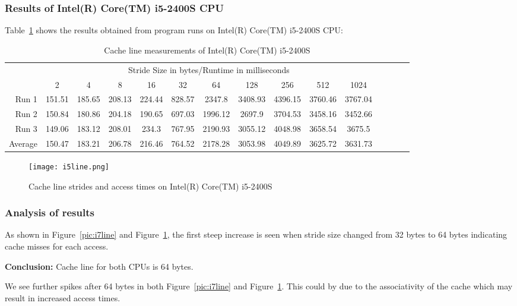 \documentclass{article}
\begin{document}
\pagebreak

\subsubsection{Results of Intel(R) Core(TM) i5-2400S CPU}

Table~\ref{tab:i5cacheline} shows the results obtained from program runs on Intel(R) Core(TM) i5-2400S CPU:

\begin{table}[H]
\footnotesize 
\begin{tabular}{r|c|c|c|c|c|c|c|c|c|c|c|c|c|c|}

\multicolumn{1}{r}{}
 &  \multicolumn{10}{c}{Stride Size in bytes/Runtime in milliseconds} \\
\cline{2-11}
  & 2 & 4 & 8 & 16 & 32 & 64 & 128 & 256 & 512 & 1024\\
\cline{2-11}
Run 1 & 151.51 & 185.65 & 208.13 & 224.44 &	828.57 & 2347.8 & 3408.93 &	4396.15 & 3760.46 & 3767.04 \\
\cline{2-11}
Run 2 & 150.84 & 180.86 & 204.18 & 190.65 & 697.03 & 1996.12 & 2697.9 & 3704.53 & 3458.16 &	3452.66 \\
\cline{2-11}
Run 3 & 149.06 & 183.12 & 208.01 & 234.3 & 767.95 & 2190.93 & 3055.12 &	4048.98 & 3658.54 &	3675.5 \\
\cline{2-11}
Average & 150.47 & 183.21 & 206.78 & 216.46 &	764.52 & 2178.28 & 3053.98 & 4049.89 & 3625.72 & 3631.73 \\
\cline{2-11}
\end{tabular}
 \caption{Cache line measurements of Intel(R) Core(TM) i5-2400S}
 \label{tab:i5cacheline}
\end{table}

\begin{figure}[H]
\centering
\texttt{[image: i5line.png]}
\caption{Cache line strides and access times on Intel(R) Core(TM) i5-2400S}
\label{pic:i5line}
\end{figure}	

\subsubsection{Analysis of results}

As shown in Figure~\ref{pic:i7line} and Figure~\ref{pic:i5line}, the first steep increase is seen when stride size changed from 32 bytes to 64 bytes indicating cache misses for each access. 
\begin{list}{•}{•}
\item \textbf{Conclusion:} Cache line for both CPUs is 64 bytes.
\end{list}
We see further spikes after 64 bytes in both Figure~\ref{pic:i7line} and Figure~\ref{pic:i5line}. This could by due to the associativity of the cache which may result in increased access times.
\end{document}
